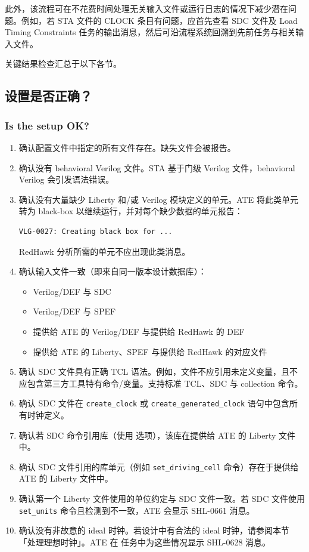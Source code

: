 此外，该流程可在不花费时间处理无关输入文件或运行日志的情况下减少潜在问题。例如，若 STA 文件的 CLOCK 条目有问题，应首先查看 SDC 文件及 Load Timing Constraints 任务的输出消息，然后可沿流程系统回溯到先前任务与相关输入文件。

关键结果检查汇总于以下各节。

\subsection{设置是否正确？}
\subsubsection*{Is the setup OK?}
\begin{enumerate}
  \item 确认配置文件中指定的所有文件存在。缺失文件会被报告。
  \item 确认没有 behavioral Verilog 文件。STA 基于门级 Verilog 文件，behavioral Verilog 会引发语法错误。
  \item 确认没有大量缺少 Liberty 和/或 Verilog 模块定义的单元。ATE 将此类单元转为 black-box 以继续运行，并对每个缺少数据的单元报告：
\begin{lstlisting}
VLG-0027: Creating black box for ...
\end{lstlisting}
  RedHawk 分析所需的单元不应出现此类消息。
  \item 确认输入文件一致（即来自同一版本设计数据库）：
  \begin{itemize}
    \item Verilog/DEF 与 SDC
    \item Verilog/DEF 与 SPEF
    \item 提供给 ATE 的 Verilog/DEF 与提供给 RedHawk 的 DEF
    \item 提供给 ATE 的 Liberty、SPEF 与提供给 RedHawk 的对应文件
  \end{itemize}
  \item 确认 SDC 文件具有正确 TCL 语法。例如，文件不应引用未定义变量，且不应包含第三方工具特有命令/变量。支持标准 TCL、SDC 与 collection 命令。
  \item 确认 SDC 文件在 \texttt{create\_clock} 或 \texttt{create\_generated\_clock} 语句中包含所有时钟定义。
  \item 确认若 SDC 命令引用库（使用  选项），该库在提供给 ATE 的 Liberty 文件中。
  \item 确认 SDC 文件引用的库单元（例如 \texttt{set\_driving\_cell} 命令）存在于提供给 ATE 的 Liberty 文件中。
  \item 确认第一个 Liberty 文件使用的单位约定与 SDC 文件一致。若 SDC 文件使用 \texttt{set\_units} 命令且检测到不一致，ATE 会显示 SHL-0661 消息。
  \item 确认没有非故意的 ideal 时钟。若设计中有合法的 ideal 时钟，请参阅本节「处理理想时钟」。ATE 在  任务中为这些情况显示 SHL-0628 消息。
\end{enumerate}

